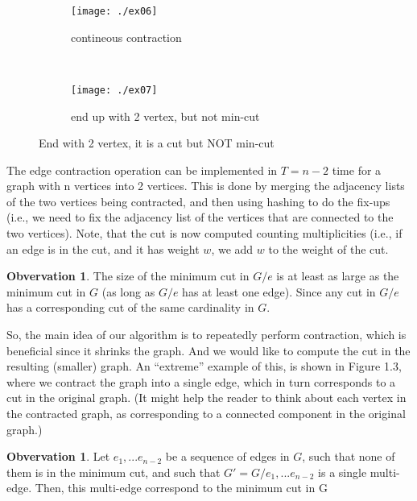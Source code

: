 \documentclass[11pt]{article}
\theoremstyle{plain}
\theoremstyle{definition}
\newtheorem{obser}[thm]{Obvervation}
\theoremstyle{remark}
\begin{document}
		\begin{figure}
		         \centering
		         \begin{subfigure}[b]{0.5\textwidth}
		                 \centering
		                 \texttt{[image: ./ex06]}
		                 \caption{contineous contraction}
		                 \label{fig:contineous contraction}
		         \end{subfigure}
		       	~
		         \begin{subfigure}[b]{0.5\textwidth}
		                 \centering
		                 \texttt{[image: ./ex07]}
		                 \caption{end up with 2 vertex, but not min-cut}
		                 \label{fig:end up with 2 vertex}
		         \end{subfigure}
		         \caption{End with 2 vertex, it is a cut but NOT min-cut}\label{fig: end with 2 vertex, it is a cut but not min-cut}
		\end{figure}
	
	The edge contraction operation can be implemented in $ T=n-2 $ time for a graph with n vertices into 2 vertices. This is done by merging the adjacency lists of the two vertices being contracted, and then using hashing to do the fix-ups (i.e., we need to fix the adjacency list of the vertices that are connected to the two vertices). Note, that the cut is now computed counting multiplicities (i.e., if an edge is in the cut, and it has weight $ w $, we add $ w $ to the weight of the cut.
	
	\begin{obser}
	The size of the minimum cut in $ G/e $ is at least as large as the minimum cut in $ G $ (as long as $ G/e $ has at least one edge). Since any cut in $ G/e $ has a corresponding cut of the same cardinality in $ G $.
	\end{obser}
	
	So, the main idea of our algorithm is to repeatedly perform contraction, which is beneficial since it shrinks the graph. And we would like to compute the cut in the resulting (smaller) graph. An “extreme” example of this, is shown in Figure 1.3, where we contract the graph into a single edge, which in turn corresponds to a cut in the original graph. (It might help the reader to think about each vertex in the contracted graph, as corresponding to a connected component in the original graph.)
	
	\begin{obser}
	Let $ e_1,...e_{n-2} $ be a sequence of edges in $ G $, such that none of them is in the minimum cut, and such that $ G'=G/{ e_1,...e_{n-2}} $ is a single multi-edge. Then, this multi-edge correspond to the minimum cut in G
	\end{obser}
	
\end{document}
